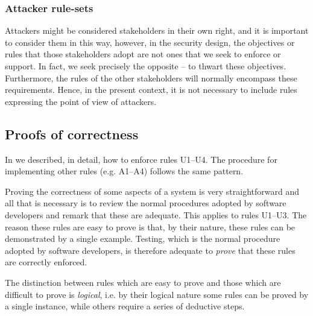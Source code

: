 \subsubsection{Attacker rule-sets}
\fi
Attackers might be considered stakeholders in their own right, and it is important to consider them in this way, however, in the security design, the objectives or rules that those stakeholders adopt are not ones that we seek to enforce or support. In fact, we seek precisely the opposite -- to thwart these objectives. Furthermore, the rules of the other stakeholders will normally encompass these requirements. Hence, in the present context, it is not necessary to include rules expressing the point of view of attackers.

\subsection{Proofs of correctness}\label{proof}

In \cite{sheniar2018experiments} we described, in detail, how to enforce rules U1--U4.
The procedure for implementing other rules (e.g. A1--A4) follows the same pattern.

Proving the correctness of some aspects of a system is very straightforward and all that is necessary is to review the normal procedures adopted by software developers and remark that these are adequate. This applies to rules U1--U3. The reason these rules are easy to prove is that, by their nature, these rules can be demonstrated by a single example. Testing, which is the normal procedure adopted by software developers, is therefore adequate to {\em prove} that these rules are correctly enforced.

The distinction between rules which are easy to prove and those which are difficult to prove is {\em logical}, i.e. by their logical nature some rules can be proved by a single instance, while others require a series of deductive steps. 


